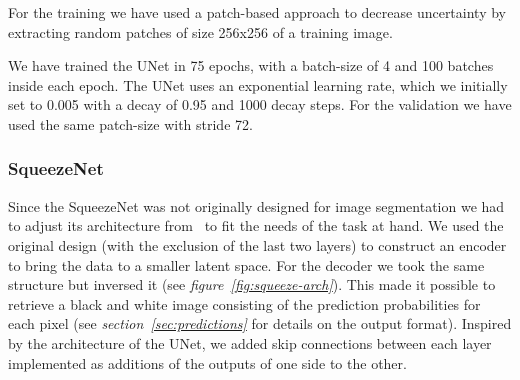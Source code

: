 \documentclass[10pt,conference,compsocconf]{IEEEtran}
\begin{document}
For the training we have used a patch-based approach to decrease uncertainty by extracting random patches of size 256x256 of a training image.

We have trained the UNet in 75 epochs, with a batch-size of 4 and 100 batches inside each epoch. The UNet uses an exponential learning rate, which we initially set to 0.005 with a decay of 0.95 and 1000 decay steps. For the validation we have used the same patch-size with stride 72.\\

\subsubsection{SqueezeNet}
Since the SqueezeNet was not originally designed for image segmentation we had to adjust its architecture from~\cite{CoRR1} to fit the needs of the task at hand. We used the original design (with the exclusion of the last two layers) to construct an encoder to bring the data to a smaller latent space. For the decoder we took the same structure but inversed it (see \textit{figure~\ref{fig:squeeze-arch}}). This made it possible to retrieve a black and white image consisting of the prediction probabilities for each pixel (see \textit{section~\ref{sec:predictions}} for details on the output format). Inspired by the architecture of the UNet, we added skip connections between each layer implemented as additions of the outputs of one side to the other.
\end{document}

